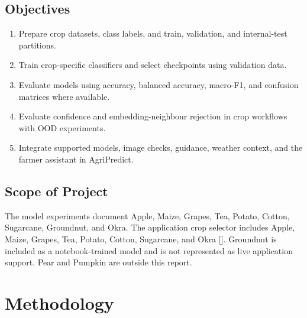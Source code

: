 \documentclass[12pt,a4paper,oneside]{report}
\begin{document}
\section{Objectives}
\begin{enumerate}[leftmargin=*]
\item Prepare crop datasets, class labels, and train, validation, and internal-test partitions.
\item Train crop-specific classifiers and select checkpoints using validation data.
\item Evaluate models using accuracy, balanced accuracy, macro-F1, and confusion matrices where available.
\item Evaluate confidence and embedding-neighbour rejection in crop workflows with OOD experiments.
\item Integrate supported models, image checks, guidance, weather context, and the farmer assistant in AgriPredict.
\end{enumerate}
\section{Scope of Project}
The model experiments document Apple, Maize, Grapes, Tea, Potato, Cotton, Sugarcane, Groundnut, and Okra. The application crop selector includes Apple, Maize, Grapes, Tea, Potato, Cotton, Sugarcane, and Okra [\cite{agripredict}]. Groundnut is included as a notebook-trained model and is not represented as live application support. Pear and Pumpkin are outside this report.

\chapter{Methodology}
\end{document}
